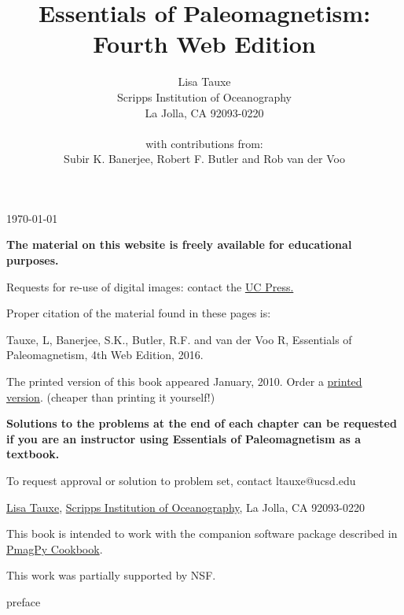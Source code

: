 \documentclass[11pt]{book}
\begin{document}
  \newcommand{\be}{\begin{equation}}%
\newcommand{\ee}{\end{equation}}%

 
 
 \title{Essentials of  Paleomagnetism: Fourth Web Edition}
 \author{Lisa Tauxe\\Scripps Institution of Oceanography\\La Jolla, CA 92093-0220\\ \\
  with contributions from: \\ Subir K. Banerjee, Robert F. Butler and Rob van der Voo}
  \today
 \maketitle
 
{\bf The material on this website is freely available for educational purposes. }

Requests for re-use of digital images: contact the \href{http://http://www.ucpress.edu}{UC Press.}

Proper citation of the material found in these pages is: 

Tauxe, L, Banerjee, S.K., Butler, R.F. and van der Voo R, Essentials of Paleomagnetism, 4th Web Edition, 2016. 

The printed version of this book appeared January, 2010. Order a \href{http://www.ucpress.edu/books/pages/11183.php}{printed version}. (cheaper than printing it yourself!)

{\bf Solutions to the problems at the end of each chapter can be requested if you are an instructor using Essentials of Paleomagnetism as a textbook.}

To request approval or solution to problem set, contact ltauxe@ucsd.edu 

\href{http://magician.ucsd.edu/~ltauxe/}{Lisa Tauxe}, \href{http://scripps.ucsd.edu}{Scripps Institution of Oceanography}, La Jolla, CA 92093-0220

This book is intended to work with the companion software package described in \href{http://earthref.org/PmagPy/cookbook/}{PmagPy Cookbook}.   

This work was partially supported by NSF.

\setcounter{page}{1}
 {preface}
\setcounter{tocdepth}{3}
\tableofcontents
\clearpage
{}
\setcounter{page}{1}




 


  




 

 




\end{document}
